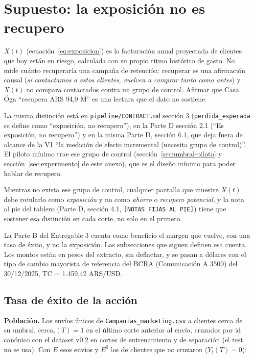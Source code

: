 \documentclass[11pt,a4paper]{article}
\begin{document}
\section{Supuesto: la exposición no es recupero}
\label{sec:exposicion-recupero}

$X(t)$ (ecuación~\eqref{eq:exposicion}) es la facturación anual proyectada de clientes que hoy están en riesgo, calculada con su propio ritmo histórico de gasto. No mide cuánto recuperaría una campaña de retención: recuperar es una afirmación causal (\emph{si contactamos a estos clientes, vuelven a comprar tanto como antes}) y $X(t)$ no compara contactados contra un grupo de control. Afirmar que Casa Óga ``recupera ARS 94,9 M'' es una lectura que el dato no sostiene.

La misma distinción está en \texttt{pipeline/CONTRACT.md} sección 3 (\texttt{perdida\_esperada} se define como ``exposición, no recupero''), en la Parte D sección 2.1 (``Es exposición, no recupero'') y en la misma Parte D, sección 6.1, que deja fuera de alcance de la V1 ``la medición de efecto incremental (necesita grupo de control)''. El piloto mínimo trae ese grupo de control (sección~\ref{sec:umbral-piloto} y sección~\ref{sec:experimento} de este anexo), que es el diseño mínimo para poder hablar de recupero.

Mientras no exista ese grupo de control, cualquier pantalla que muestre $X(t)$ debe rotularlo como \emph{exposición} y no como \emph{ahorro} o \emph{recupero potencial}, y la nota al pie del tablero (Parte D, sección 4.1, \texttt{[NOTAS FIJAS AL PIE]}) tiene que sostener esa distinción en cada corte, no solo en el primero.

La Parte B del Entregable 3 cuenta como beneficio el margen que vuelve, con una tasa de éxito, y no la exposición. Las subsecciones que siguen definen esa cuenta. Los montos están en pesos del extracto, sin deflactar, y se pasan a dólares con el tipo de cambio mayorista de referencia del BCRA (Comunicación A 3500) del 30/12/2025, TC = 1.459,42 ARS/USD.

\subsection{Tasa de éxito de la acción}
\label{sec:tasa-exito}

\textbf{Población.} Los envíos únicos de \texttt{Campanias\_marketing.csv} a clientes cerca de su umbral, $\mathrm{cerca}_i(T)=1$ en el último corte anterior al envío, cruzados por id canónico con el dataset v0.2 en cortes de entrenamiento y de separación (el test no se usa). Con $E$ esos envíos y $E^{0}$ los de clientes que no cruzaron ($Y_i(T)=0$):
\end{document}
